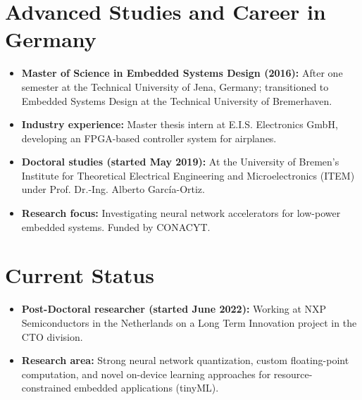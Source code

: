 \documentclass{article}
\begin{document}
\section*{Advanced Studies and Career in Germany}
\begin{itemize}[noitemsep]
    \item \textbf{Master of Science in Embedded Systems Design (2016):} After one semester at the Technical University of Jena, Germany; transitioned to Embedded Systems Design at the Technical University of Bremerhaven.
    \item \textbf{Industry experience:} Master thesis intern at E.I.S. Electronics GmbH, developing an FPGA-based controller system for airplanes.
    \item \textbf{Doctoral studies (started May 2019):} At the University of Bremen's Institute for Theoretical Electrical Engineering and Microelectronics (ITEM) under Prof. Dr.-Ing. Alberto García-Ortiz.
    \item \textbf{Research focus:} Investigating neural network accelerators for low-power embedded systems. Funded by CONACYT.
\end{itemize}

\section*{Current Status}
\begin{itemize}[noitemsep]
    \item \textbf{Post-Doctoral researcher (started June 2022):} Working at NXP Semiconductors in the Netherlands on a Long Term Innovation project in the CTO division.
    \item \textbf{Research area:} Strong neural network quantization, custom floating-point computation, and novel on-device learning approaches for resource-constrained embedded applications (tinyML).
\end{itemize}
\end{document}
